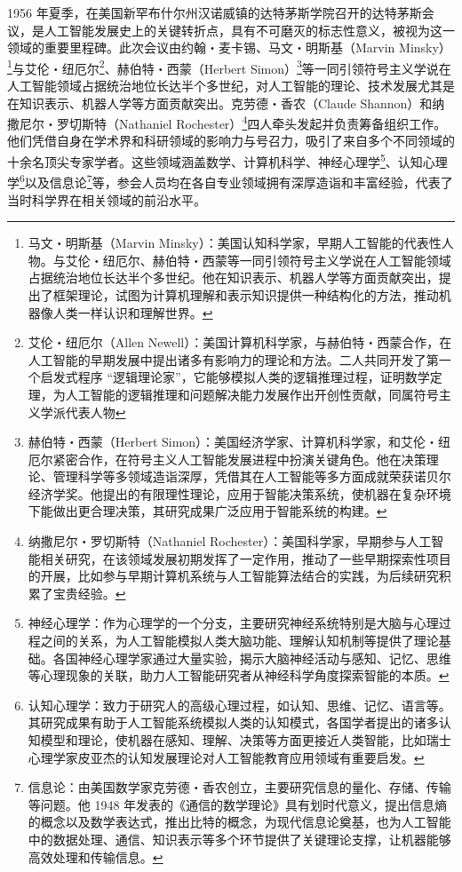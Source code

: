 1956 年夏季，在美国新罕布什尔州汉诺威镇的达特茅斯学院召开的达特茅斯会议，是人工智能发展史上的关键转折点，具有不可磨灭的标志性意义，被视为这一领域的重要里程碑。此次会议由约翰・麦卡锡、马文・明斯基（Marvin Minsky）\footnote{马文・明斯基（Marvin Minsky）：美国认知科学家，早期人工智能的代表性人物。与艾伦・纽厄尔、赫伯特・西蒙等一同引领符号主义学说在人工智能领域占据统治地位长达半个多世纪。他在知识表示、机器人学等方面贡献突出，提出了框架理论，试图为计算机理解和表示知识提供一种结构化的方法，推动机器像人类一样认识和理解世界。}与艾伦・纽厄尔\footnote{艾伦・纽厄尔（Allen Newell）：美国计算机科学家，与赫伯特・西蒙合作，在人工智能的早期发展中提出诸多有影响力的理论和方法。二人共同开发了第一个启发式程序 “逻辑理论家”，它能够模拟人类的逻辑推理过程，证明数学定理，为人工智能的逻辑推理和问题解决能力发展作出开创性贡献，同属符号主义学派代表人物}、赫伯特・西蒙（Herbert Simon）\footnote{赫伯特・西蒙（Herbert Simon）：美国经济学家、计算机科学家，和艾伦・纽厄尔紧密合作，在符号主义人工智能发展进程中扮演关键角色。他在决策理论、管理科学等多领域造诣深厚，凭借其在人工智能等多方面成就荣获诺贝尔经济学奖。他提出的有限理性理论，应用于智能决策系统，使机器在复杂环境下能做出更合理决策，其研究成果广泛应用于智能系统的构建。}等一同引领符号主义学说在人工智能领域占据统治地位长达半个多世纪，对人工智能的理论、技术发展尤其是在知识表示、机器人学等方面贡献突出。克劳德・香农（Claude Shannon）和纳撒尼尔・罗切斯特（Nathaniel Rochester）\footnote{纳撒尼尔・罗切斯特（Nathaniel Rochester）：美国科学家，早期参与人工智能相关研究，在该领域发展初期发挥了一定作用，推动了一些早期探索性项目的开展，比如参与早期计算机系统与人工智能算法结合的实践，为后续研究积累了宝贵经验。}四人牵头发起并负责筹备组织工作。他们凭借自身在学术界和科研领域的影响力与号召力，吸引了来自多个不同领域的十余名顶尖专家学者。这些领域涵盖数学、计算机科学、神经心理学\footnote{神经心理学：作为心理学的一个分支，主要研究神经系统特别是大脑与心理过程之间的关系，为人工智能模拟人类大脑功能、理解认知机制等提供了理论基础。各国神经心理学家通过大量实验，揭示大脑神经活动与感知、记忆、思维等心理现象的关联，助力人工智能研究者从神经科学角度探索智能的本质。}、认知心理学\footnote{认知心理学：致力于研究人的高级心理过程，如认知、思维、记忆、语言等。其研究成果有助于人工智能系统模拟人类的认知模式，各国学者提出的诸多认知模型和理论，使机器在感知、理解、决策等方面更接近人类智能，比如瑞士心理学家皮亚杰的认知发展理论对人工智能教育应用领域有重要启发。}以及信息论\footnote{信息论：由美国数学家克劳德・香农创立，主要研究信息的量化、存储、传输等问题。他 1948 年发表的《通信的数学理论》具有划时代意义，提出信息熵的概念以及数学表达式，推出比特的概念，为现代信息论奠基，也为人工智能中的数据处理、通信、知识表示等多个环节提供了关键理论支撑，让机器能够高效处理和传输信息。}等，参会人员均在各自专业领域拥有深厚造诣和丰富经验，代表了当时科学界在相关领域的前沿水平。
